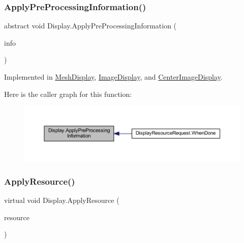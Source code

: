 \subsubsection{\texorpdfstring{Apply\+Pre\+Processing\+Information()}{ApplyPreProcessingInformation()}}
{\footnotesize\ttfamily abstract void Display.\+Apply\+Pre\+Processing\+Information (\begin{DoxyParamCaption}\item[{\mbox{\hyperlink{class_pre_processing_game_object_information}{Pre\+Processing\+Game\+Object\+Information}}}]{info }\end{DoxyParamCaption})\hspace{0.3cm}{\ttfamily [pure virtual]}}



Implemented in \mbox{\hyperlink{class_mesh_display_ab52b4d43c963b3bef383e2eebd1e4115}{Mesh\+Display}}, \mbox{\hyperlink{class_image_display_a0ad82d85f6c4ec5eabb65afa1ae72bc1}{Image\+Display}}, and \mbox{\hyperlink{class_center_image_display_af746f7d72e82809aaa0b5b5bf0ad2cc0}{Center\+Image\+Display}}.

Here is the caller graph for this function\+:
\nopagebreak
\begin{figure}[H]
\begin{center}
\leavevmode
\includegraphics[width=350pt]{class_display_ab9cd24c11c43dd87bc50e85a8e9e4c31_icgraph}
\end{center}
\end{figure}
\mbox{\label{class_display_a811157ddb42ae4d72f690457a08711d3}} 
\subsubsection{\texorpdfstring{Apply\+Resource()}{ApplyResource()}}
{\footnotesize\ttfamily virtual void Display.\+Apply\+Resource (\begin{DoxyParamCaption}\item[{\mbox{\hyperlink{class_base_display_resource}{Base\+Display\+Resource}}}]{resource }\end{DoxyParamCaption})\hspace{0.3cm}{\ttfamily [virtual]}}



